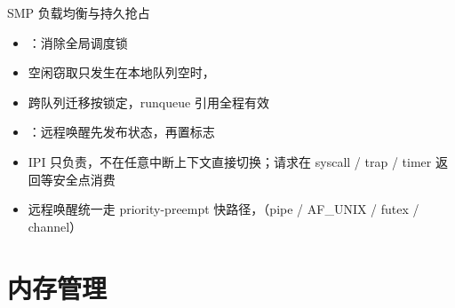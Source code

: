 \documentclass[aspectratio=1610]{beamer}
\begin{document}
\begin{frame}{SMP 负载均衡与持久抢占}
    \begin{itemize}
        \item {}：消除全局调度锁
        \item 空闲窃取只发生在本地队列空时，
        \item 跨队列迁移按锁定，runqueue 引用全程有效
        \item {}：远程唤醒先发布状态，再置标志
        \item IPI 只负责，不在任意中断上下文直接切换；请求在 syscall / trap / timer 返回等安全点消费
        \item 远程唤醒统一走 priority-preempt 快路径，（pipe / AF\_UNIX / futex / channel）
    \end{itemize}
    \vspace{0.3em}
\end{frame}

\renewcommand{\azsectionsummary}{%
    VMO/VMAR 解耦物理页与地址空间；大页降级、COW、MAP\_SHARED 脏页生命周期完整；%
    Pager 把缺页变成用户态可处理的 channel 消息。}
\section{内存管理}
\end{document}
